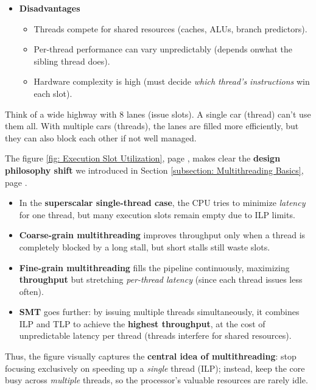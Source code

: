 \begin{itemize}
\begin{itemize}
        \item[\textcolor{Red2}{\faIcon{times-circle}}] \textcolor{Red2}{\textbf{Disadvantages}}
        \begin{itemize}
            \item[\textcolor{Red2}{\faIcon{times}}] Threads compete for shared resources (caches, ALUs, branch predictors).
            \item[\textcolor{Red2}{\faIcon{times}}] Per-thread performance can vary unpredictably (depends on\break what the sibling thread does).
            \item[\textcolor{Red2}{\faIcon{times}}] Hardware complexity is high (must decide \emph{which thread's instructions} win each slot).
        \end{itemize}
    \end{itemize}

    \begin{examplebox}
        Think of a wide highway with 8 lanes (issue slots). A single car (thread) can't use them all. With multiple cars (threads), the lanes are filled more efficiently, but they can also block each other if not well managed.
    \end{examplebox}
\end{itemize}
The figure \ref{fig: Execution Slot Utilization}, page \pageref{fig: Execution Slot Utilization}, makes clear the \textbf{design philosophy shift} we introduced in Section \ref{subsection: Multithreading Basics}, page \pageref{subsection: Multithreading Basics}.
\begin{itemize}
    \item In the \textbf{superscalar single-thread case}, the CPU tries to minimize \emph{latency} for one thread, but many execution slots remain empty due to ILP limits.
    \item \textbf{Coarse-grain multithreading} improves throughput only when a thread is completely blocked by a long stall, but short stalls still waste slots.
    \item \textbf{Fine-grain multithreading} fills the pipeline continuously, maximizing \textbf{throughput} but stretching \emph{per-thread latency} (since each thread issues less often).
    \item \textbf{SMT} goes further: by issuing multiple threads simultaneously, it combines ILP and TLP to achieve the \textbf{highest throughput}, at the cost of unpredictable latency per thread (threads interfere for shared resources).
\end{itemize}
Thus, the figure visually captures the \textbf{central idea of multithreading}: stop focusing exclusively on speeding up a \emph{single} thread (ILP); instead, keep the core busy across \emph{multiple} threads, so the processor's valuable resources are rarely idle.

